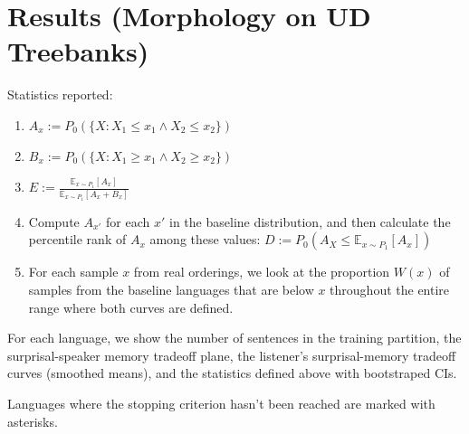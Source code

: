 \documentclass[11pt,letterpaper]{article}
\newcommand{\E}[0]{\mathbb{E}}
\begin{document}
\section{Results (Morphology on UD Treebanks)}\label{sec:results-table}

Statistics reported:

\begin{enumerate}
	\item $A_x := P_0(\{X : X_1 \leq x_1 \wedge X_2 \leq x_2\})$
	\item $B_x := P_0(\{X : X_1 \geq x_1 \wedge X_2 \geq x_2\})$
	\item  $E := \frac{\E_{x \sim P_1}[A_x]}{\E_{x \sim P_1}[A_x+B_x]}$
	\item Compute $A_{x'}$ for each $x'$ in the baseline distribution, and then calculate the percentile rank of $A_x$ among these values:
$D := P_0(A_X \leq \E_{x \sim P_1}[A_x])$
\item For each sample $x$ from real orderings, we look at the proportion $W(x)$ of samples from the baseline languages that are below $x$ throughout the entire range where both curves are defined.

\end{enumerate}


For each language, we show the number of sentences in the training partition, the surprisal-speaker memory tradeoff plane, the listener's surprisal-memory tradeoff curves (smoothed means), and the statistics defined above with bootstraped CIs.

Languages where the stopping criterion hasn't been reached are marked with asterisks.
\end{document}
